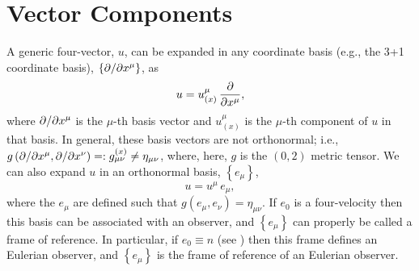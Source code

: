 \section{Vector Components}

A generic four-vector, $u$, can be expanded in any coordinate basis
(e.g., the 3+1 coordinate basis),
$\left\{\partial/\partial x^{\mu}\right\}$, as
\begin{equation}
  u=u_{\left(x\right)}^{\mu}\,\frac{\partial}{\partial x^{\mu}},
\end{equation}
where $\partial/\partial x^{\mu}$ is the $\mu$-th basis vector
and $u_{\left(x\right)}^{\mu}$ is the $\mu$-th component of $u$ in
that basis.
In general, these basis vectors are not orthonormal;
i.e., $g\left(\partial/\partial x^{\mu},\partial/\partial x^{\nu}\right)
=:g^{\left(x\right)}_{\mu\nu}\neq\eta_{\mu\nu}$,
where, here, $g$ is the $\left(0,2\right)$ metric tensor.
We can also expand $u$ in an orthonormal basis, $\left\{e_{\mu}\right\}$,
\begin{equation}
  u=u^{\mu}\,e_{\mu},
\end{equation}
where the $e_{\mu}$ are defined such that
$g\left(e_{\mu},e_{\nu}\right)=\eta_{\mu\nu}$.
If $e_{0}$ is a four-velocity then this basis can be associated
with an observer, and $\left\{e_{\mu}\right\}$ can properly
be called a frame of reference.
In particular, if $e_{0}\equiv n$ (see ) then this frame defines
an Eulerian observer, and $\left\{e_{\mu}\right\}$ is the frame of
reference of an Eulerian observer.

